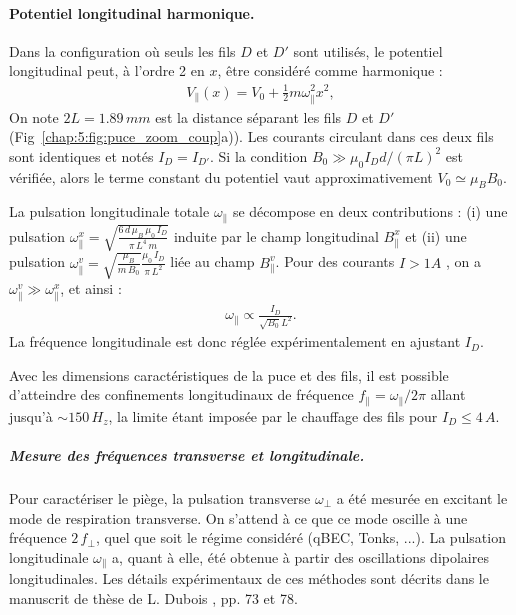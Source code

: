 \paragraph{Potentiel longitudinal harmonique.}
Dans la configuration où seuls les fils $D$ et $D'$ sont utilisés, le potentiel longitudinal peut, à l’ordre 2 en $x$, être considéré comme harmonique :
\begin{eqnarray}\label{chap5:eq.pot.long.1}
	V_\parallel (x) = V_0 + \frac{1}{2} m \omega_\parallel^2 x^2 ,
\end{eqnarray}
On note  $2L=1.89 \,mm$ est la distance séparant les fils $D$ et $D'$ (Fig~\ref{chap:5:fig:puce_zoom_coup}a)). Les courants circulant dans ces deux fils sont identiques et notés $I_D = I_{D'}$. Si la condition $B_0 \gg \mu_0 I_D d /(\pi L)^2 $ est vérifiée, alors le terme constant du potentiel vaut approximativement $V_0 \simeq \mu_B B_0$.

\medskip

La pulsation longitudinale totale $\omega_\parallel$ se décompose en deux contributions\cite{jacqm2012} : (i) une pulsation $\omega_\parallel^x = \sqrt{\frac{6\, d \, \mu_B \, \mu_0 \,I_D }{\pi \, L^4 \, m}}$ induite par le champ longitudinal $B_\parallel^x$ et (ii) une pulsation $\omega_\parallel^v = \sqrt{\frac{\mu_B }{m \, B_0}}\frac{\mu_0 \, I_D }{\pi \, L^2}$ liée au champ  $B_\parallel^v$. Pour des courants $I>1A$ , on a $\omega_\parallel^v \gg \omega_\parallel^x$, et ainsi :  
\begin{eqnarray*}
	\omega_\parallel \propto \frac{I_D}{\sqrt{B_0} L^2}.
\end{eqnarray*} 
La fréquence longitudinale est donc réglée expérimentalement en ajustant $I_D$.

\medskip

Avec les dimensions caractéristiques de la puce et des fils, il est possible d’atteindre des confinements longitudinaux de fréquence $f_\parallel = \omega_\parallel/ 2 \pi$ allant jusqu’à $\sim 150 \, H_z$, la limite étant imposée par le chauffage des fils pour $I_D \leq 4 \, A$.
 
 \medskip
 
\subparagraph{Mesure des fréquences transverse et longitudinale.}
Pour caractériser le piège, la pulsation transverse $\omega_\perp$ a été mesurée en excitant le mode de respiration transverse. On s'attend à ce que ce mode oscille à une fréquence $2 \, f_\perp$, quel que soit le régime considéré (\gls{qBEC}, Tonks, ...)\cite{PhysRevA.54.R1753}. La pulsation longitudinale $\omega_\parallel$ a, quant à elle, été obtenue à partir des oscillations dipolaires longitudinales. Les détails expérimentaux de ces méthodes sont décrits dans le manuscrit de thèse de L. Dubois \cite{L.Dubois2024}, pp. 73 et 78.


